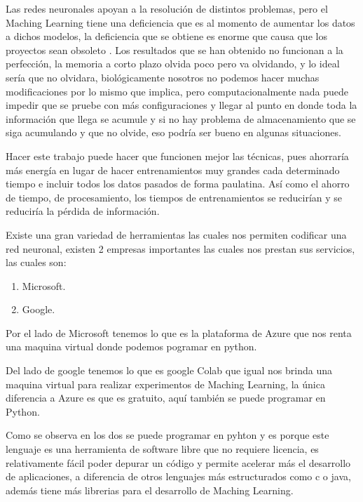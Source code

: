         Las redes neuronales apoyan a la resoluci\'on de distintos problemas, pero el Maching Learning 
        tiene una deficiencia que es al momento de aumentar los datos a dichos modelos, la deficiencia 
        que se obtiene es enorme que causa que los proyectos sean obsoleto \cite{Bullinaria2009}. Los 
        resultados que se han obtenido no funcionan a la perfección, la memoria a corto plazo olvida poco 
        pero va olvidando, y lo ideal sería que no olvidara, biológicamente nosotros no podemos 
        hacer muchas modificaciones por lo mismo que implica, pero computacionalmente nada puede 
        impedir que se pruebe con más configuraciones y llegar al punto en donde toda la información 
        que llega se acumule y si no hay problema de almacenamiento que se siga acumulando y que no olvide, 
        eso podría ser bueno en algunas situaciones.

        Hacer este trabajo puede hacer que funcionen mejor las técnicas, pues ahorraría más energía 
        en lugar de hacer entrenamientos muy grandes cada determinado tiempo e incluir todos los datos 
        pasados de forma paulatina. Así como el ahorro de tiempo, de procesamiento, los tiempos de 
        entrenamientos se reducirían y se reduciría la pérdida de información.

        Existe una gran variedad de herramientas las cuales nos permiten codificar una red neuronal, existen 2 empresas 
        importantes las cuales nos prestan sus servicios, las cuales son:
        \begin{enumerate}
            \item Microsoft.
            \item Google.
        \end{enumerate}
        Por el lado de Microsoft tenemos lo que es la plataforma de Azure que nos renta una maquina virtual donde podemos 
        pogramar en python.

        Del lado de google tenemos lo que es google Colab que igual nos brinda una maquina virtual para realizar experimentos de Maching
        Learning, la \'unica diferencia a Azure es que es gratuito, aqu\'i también se puede programar en Python.

        Como se observa en los dos se puede programar en pyhton y es porque este lenguaje es una herramienta de 
        software libre que no requiere licencia, es relativamente fácil poder depurar un código y permite acelerar 
        más el desarrollo de aplicaciones,  a diferencia de otros lenguajes más estructurados 
        como c o java, adem\'as tiene m\'as librerias para el desarrollo de Maching Learning. \\

